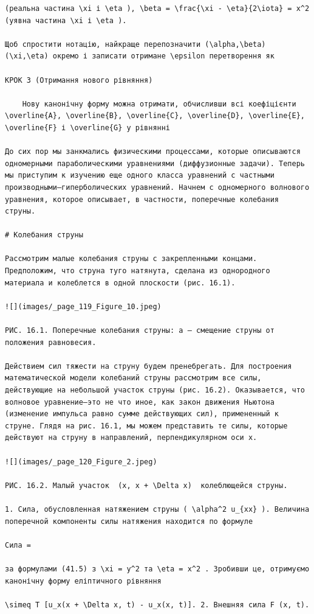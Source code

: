 \documentclass[
  ukrainian,
]{article}
\begin{document}
\begin{verbatim}
(реальна частина \xi і \eta ), \beta = \frac{\xi - \eta}{2\iota} = x^2 (уявна частина \xi і \eta ).

Щоб спростити нотацію, найкраще перепозначити (\alpha,\beta) (\xi,\eta) окремо і записати отримане \epsilon перетворення як

КРОК 3 (Отримання нового рівняння)

    Нову канонічну форму можна отримати, обчисливши всі коефіцієнти \overline{A}, \overline{B}, \overline{C}, \overline{D}, \overline{E}, \overline{F} і \overline{G} у рівнянні

До сих пор мы занкмались физическими процессами, которые описываются одномерными параболическими уравнениями (диффузионные задачи). Теперь мы приступим к изучению еще одного класса уравнений с частными производными—гиперболических уравнений. Начнем с одномерного волнового уравнения, которое описывает, в частности, поперечные колебания струны.

# Колебания струны

Рассмотрим малые колебания струны с закрепленными концами. Предположим, что струна туго натянута, сделана из однородного материала и колеблется в одной плоскости (рис. 16.1).

![](images/_page_119_Figure_10.jpeg)

РИС. 16.1. Поперечные колебания струны: a — смещение струны от положения равновесия.

Действием сил тяжести на струну будем пренебрегать. Для построения математической модели колебаний струны рассмотрим все силы, действующие на небольшой участок струны (рис. 16.2). Оказывается, что волновое уравнение—это не что иное, как закон движения Ньютона (изменение импульса равно сумме действующих сил), примененный к струне. Глядя на рис. 16.1, мы можем представить те силы, которые действуют на струну в направлений, перпендикулярном оси х.

![](images/_page_120_Figure_2.jpeg)

РИС. 16.2. Малый участок  (x, x + \Delta x)  колеблющейся струны.

1. Сила, обусловленная натяжением струны ( \alpha^2 u_{xx} ). Величина поперечной компоненты силы натяжения находится по формуле

Сила =

за формулами (41.5) з \xi = y^2 та \eta = x^2 . Зробивши це, отримуємо канонічну форму еліптичного рівняння

\simeq T [u_x(x + \Delta x, t) - u_x(x, t)]. 2. Внешняя сила F (x, t).


\end{verbatim}
\end{document}
